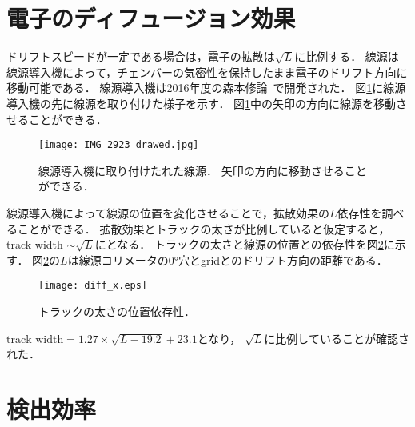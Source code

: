\documentclass[../master]{subfiles}
\begin{document}
\section{電子のディフュージョン効果}
ドリフトスピードが一定である場合は，電子の拡散は$\sqrt{L}$に比例する．
線源は線源導入機によって，チェンバーの気密性を保持したまま電子のドリフト方向に移動可能である．
線源導入機は2016年度の森本修論~\cite{morimoto_thesis}で開発された．
図\ref{pic::source_insirtion}に線源導入機の先に線源を取り付けた様子を示す．
図\ref{pic::source_insirtion}中の矢印の方向に線源を移動させることができる．
\begin{figure}
  \centering
  \texttt{[image: IMG\_2923\_drawed.jpg]}
  \caption[線源導入機に取り付けたれた線源．]
          {線源導入機に取り付けたれた線源．
          矢印の方向に移動させることができる．}
  \label{pic::source_insirtion}
\end{figure}
線源導入機によって線源の位置を変化させることで，拡散効果の$L$依存性を調べることができる．
拡散効果とトラックの太さが比例していると仮定すると，track width $\sim\sqrt{L}$にとなる．
トラックの太さと線源の位置との依存性を図\ref{fig::diff_x}に示す．
図\ref{fig::diff_x}の$L$は線源コリメータの\ang{0}穴とgridとのドリフト方向の距離である．
\begin{figure}
  \centering
  \texttt{[image: diff\_x.eps]}
  \caption{トラックの太さの位置依存性．}
  \label{fig::diff_x}
\end{figure}
$\text{track width} = 1.27\times\sqrt{L-19.2}+23.1$となり，
$\sqrt{L}$に比例していることが確認された．


\section{検出効率}
\end{document}

